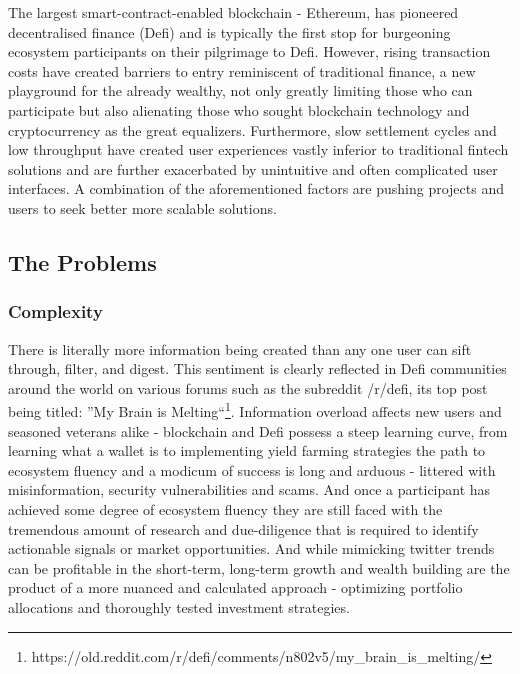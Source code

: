 \documentclass[10pt]{article}
\begin{document}
			The largest smart-contract-enabled blockchain - Ethereum, has
			pioneered decentralised finance (Defi) and is typically the first stop for burgeoning
			ecosystem participants on their pilgrimage to Defi. However, rising transaction costs
			have created barriers to entry reminiscent of traditional finance, a new playground for
			the already wealthy, not only greatly limiting those who can participate but also
			alienating those who sought blockchain technology and cryptocurrency as the great
			equalizers. Furthermore, slow settlement cycles and low throughput have created user
			experiences vastly inferior to traditional fintech solutions and are further exacerbated
			by unintuitive and often complicated user interfaces. A combination of the
			aforementioned factors are pushing projects and users to seek better more scalable solutions.

		\subsection{The Problems}
			\subsubsection{Complexity}
					There is literally more information being created than any one user can
					sift through, filter, and digest. This sentiment is clearly reflected in
					Defi communities around the world on various forums such as the
					subreddit /r/defi, its top post being titled: ''My Brain is
					Melting``\footnote[2]{https://old.reddit.com/r/defi/comments/n802v5/my\_brain\_is\_melting/}.
					Information overload affects new users and seasoned veterans alike
					- blockchain and Defi possess a steep learning curve, from learning what
					a wallet is to implementing yield farming strategies the path to
					ecosystem fluency and a modicum of success is long and arduous - littered with
					misinformation, security vulnerabilities and scams.
					And once a participant has achieved some degree of ecosystem fluency
					they are still faced with the tremendous amount of research and
					due-diligence that is required to identify actionable signals or market
					opportunities. And while mimicking twitter trends can be profitable in
					the short-term, long-term growth and wealth building are the product of
					a more nuanced and calculated approach - optimizing portfolio
					allocations and thoroughly tested investment strategies.
\end{document}
